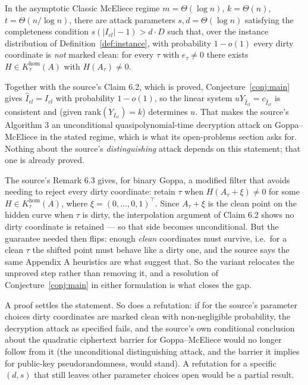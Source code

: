 \documentclass{aicr-conjecture}
\newcommand{\hm}{\mathrm{hom}}
\begin{document}
\begin{conjecture}\label{conj:main}
In the asymptotic Classic McEliece regime $m = \Theta(\log n)$, $k =
\Theta(n)$, $t = \Theta(n / \log n)$, there are attack parameters $s, d =
\Theta(\log n)$ satisfying the completeness condition $s(|I_{cl}| - 1) >
d \cdot D$ such that, over the instance distribution of
Definition~\ref{def:instance}, with probability $1 - o(1)$ every dirty
coordinate is \emph{not} marked clean: for every $\tau$ with $e_{\tau}
\ne 0$ there exists $H \in K^{\hm}_{\tau}(A)$ with
$H(A_{\tau}) \ne 0$.
\end{conjecture}

\begin{remark}
Together with the source's Claim 6.2, which is proved,
Conjecture~\ref{conj:main} gives $\widehat{I}_{cl} = I_{cl}$ with
probability $1 - o(1)$, so the linear system $u
Y_{\widehat{I}_{cl}} = c_{\widehat{I}_{cl}}$ is consistent and (given
$\mathrm{rank}(Y_{I_{cl}}) = k$) determines $u$. That makes the source's
Algorithm 3 an unconditional quasipolynomial-time decryption attack on
Goppa--McEliece in the stated regime, which is what its open-problems
section asks for. Nothing about the source's \emph{distinguishing}
attack depends on this statement; that one is already proved.
\end{remark}

\begin{remark}\label{rem:onesided}
The source's Remark 6.3 gives, for binary Goppa, a modified filter that
avoids needing to reject every dirty coordinate: retain $\tau$ when
$H(A_{\tau} + \xi) \ne 0$ for some $H \in K^{\hm}_{\tau}(A)$,
where $\xi = (0,\dots,0,1)^{\top}$. Since $A_{\tau} + \xi$ is the clean
point on the hidden curve when $\tau$ is dirty, the interpolation
argument of Claim 6.2 shows no dirty coordinate is retained --- so that
side becomes unconditional. But the guarantee needed then flips: enough
\emph{clean} coordinates must survive, i.e.\ for a clean $\tau$ the
shifted point must behave like a dirty one, and the source says the same
Appendix A heuristics are what suggest that. So the variant relocates the
unproved step rather than removing it, and a resolution of
Conjecture~\ref{conj:main} in either formulation is what closes the gap.
\end{remark}

\begin{remark}
A proof settles the statement. So does a refutation: if for the source's
parameter choices dirty coordinates are marked clean with non-negligible
probability, the decryption attack as specified fails, and the source's
own conditional conclusion about the quadratic ciphertext barrier for
Goppa--McEliece would no longer follow from it (the unconditional
distinguishing attack, and the barrier it implies for public-key
pseudorandomness, would stand). A refutation for a specific $(d,s)$ that
still leaves other parameter choices open would be a partial result.
\end{remark}
\end{document}
